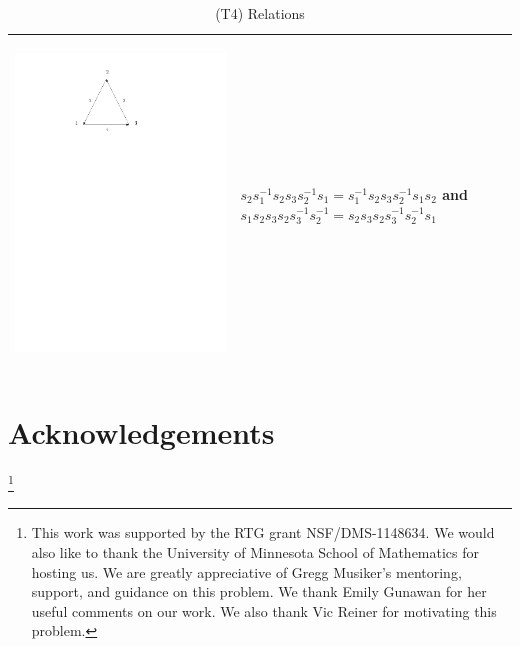 \documentclass[11pt]{amsart}
\theoremstyle{definition}
\begin{document}
\begin{table}[h]
\begin{tabular}{| p{3.5cm} | p{7cm} |}
\begin{center}\includegraphics[scale = .30]{Diagram5.pdf}\end{center} & $s_{2}s_{1}^{-1}s_{2}s_{3}s_{2}^{-1}s_{1} = s_{1}^{-1}s_{2}s_{3}s_{2}^{-1}s_{1}s_{2}$ and $s_{1}s_{2}s_{3}s_{2}s_{3}^{-1}s_{2}^{-1} = s_{2}s_{3}s_{2}s_{3}^{-1}s_{2}^{-1}s_{1}$ \\ \hline
\end{tabular}
\caption{(T4) Relations} \label{table2}
\end{table}


\section{Acknowledgements}
\thanks{This work was supported by the RTG grant NSF/DMS-1148634. We would also like to thank the University of Minnesota School of Mathematics for hosting us. We are greatly appreciative of Gregg Musiker's mentoring, support, and guidance on this problem. We thank Emily Gunawan for her useful comments on our work. We also thank Vic Reiner for motivating this problem.}



\end{document}
